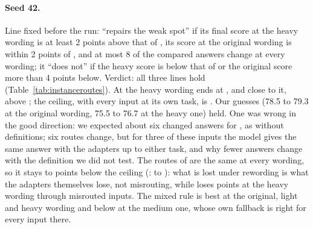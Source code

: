 \paragraph{Seed 42.} Line fixed before the run: \recog{} ``repairs the weak spot'' if its final score at the heavy
wording is at least 2 points above that of \cert{}, its score at the original wording is within
2 points of \cert{}, and at most 8 of the \AudUCompared{} compared answers change at every wording;
it ``does not'' if the heavy score is below that of \cert{} or the original score more than 4
points below. Verdict: all three lines hold (Table~\ref{tab:instanceroutes}). At the heavy wording \recog{} ends at
\AudUHeavyRidgeAP{}, and \handicap{} close to it, above \cert{}; the ceiling, with every input at its own task, is \AudUHeavyOwnAP{}. Our guesses (78.5 to 79.3 at the original wording, 75.5 to 76.7 at the heavy one) held. One was wrong in the good direction: we expected about six changed answers for \recog{}, as without definitions; six routes change, but for three
of these inputs the model gives the same answer with the adapters up to either task, and why fewer answers change with the definition we did not test. The routes of \recog{} are the same at every wording, so it stays
\AudURidgeBelowOwnLow{} to \AudURidgeBelowOwnHigh{} points below the ceiling (\handicap{}: \AudUHandicapBelowOwnLow{} to \AudUHandicapBelowOwnHigh{}): what is lost
under rewording is what the adapters themselves lose, not misrouting, while \cert{} loses
\AudUHeavyCertBelowOwn{} points at the heavy wording through misrouted
inputs. The mixed rule is best at the original, light and heavy wording and below \cert{} at the medium one, whose own fallback is right for every input there.

